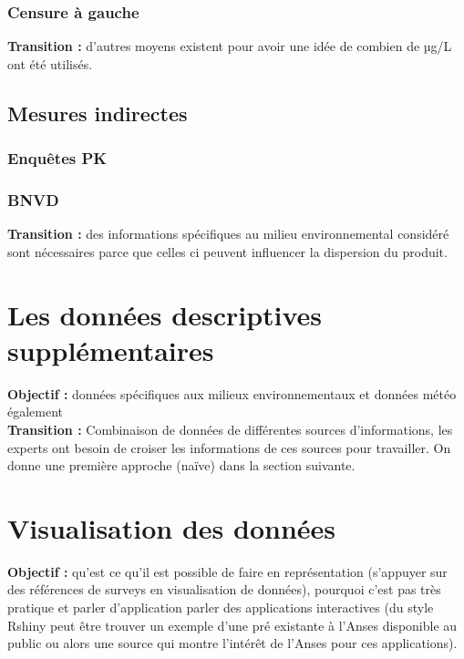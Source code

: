 \documentclass[12pt, twoside]{report}
\begin{document}
\subsubsection{Censure à gauche}

\textbf{Transition :} d'autres moyens existent pour avoir une idée de combien de µg/L ont été utilisés. 

\subsection{Mesures indirectes}
\subsubsection{Enquêtes PK}
\subsubsection{BNVD}

\textbf{Transition :} des informations spécifiques au milieu environnemental considéré sont nécessaires parce que celles ci peuvent influencer la dispersion du produit. 

\section{Les données descriptives supplémentaires}

\textbf{Objectif :} données spécifiques aux milieux environnementaux et données météo également \\

\textbf{Transition :} Combinaison de données de différentes sources d'informations, les experts ont besoin de croiser les informations de ces sources pour travailler. On donne une première approche (naïve) dans la section suivante.

\section{Visualisation des données}

\textbf{Objectif :} qu'est ce qu'il est possible de faire en représentation (s'appuyer sur des références de surveys en visualisation de données), pourquoi c'est pas très pratique et parler d'application parler des applications interactives (du style Rshiny peut être trouver un exemple d'une pré existante à l'Anses disponible au public ou alors une source qui montre l'intérêt de l'Anses pour ces applications). \\
\end{document}
